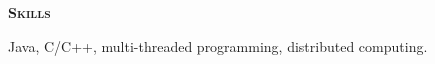\documentclass[10pt, letterpaper]{article}
\newlength{\firstoffset}
\newcommand{\myscitem}[1]{\vspace{0.5\baselineskip} {\Large \textbf{\textsc{#1}} \reallynopagebreak}}
\newcommand{\mydate}[1]{{\small #1}}
\newcommand{\myright}{\hspace*\fill}
\newcommand{\myrightdate}[1]{\myright \mydate{#1}}
\newenvironment{myexp}{
  \begin{list}{}{
      \setlength{\itemindent}{-0.15in}
      \setlength{\leftmargin}{0.3in}
      \addtolength{\topsep}{-0.1in}
    }
}{\end{list}}
\newenvironment{mybullet}{
  \begin{list}{\labelitemi}{
      \setlength{\itemindent}{0in}
      \setlength{\leftmargin}{0.15in}
      \setlength{\topsep}{0.02in}
      \setlength{\partopsep}{0pt}
    }
}{\end{list}}
\begin{document}
\thispagestyle{first}
\enlargethispage*{-\firstoffset}







\myscitem{Skills}
\begin{myexp}
\item Java, C/C++, multi-threaded programming, distributed computing.
\end{myexp}



%







\end{document}
